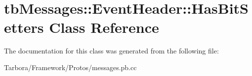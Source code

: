 \hypertarget{classtbMessages_1_1EventHeader_1_1HasBitSetters}{}\section{tb\+Messages\+:\+:Event\+Header\+:\+:Has\+Bit\+Setters Class Reference}
\label{classtbMessages_1_1EventHeader_1_1HasBitSetters}


The documentation for this class was generated from the following file\+:\begin{DoxyCompactItemize}
\item 
Tarbora/\+Framework/\+Protos/messages.\+pb.\+cc\end{DoxyCompactItemize}
